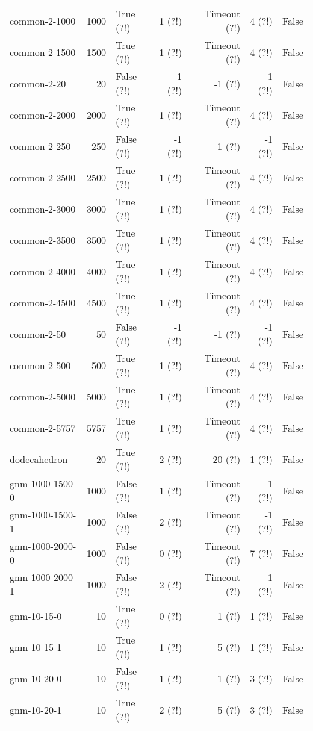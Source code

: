 \begin{longtable}{lrlrrrl}
common-2-1000 & 1000 & True (?!) & 1 (?!) & Timeout (?!) & 4 (?!) & False \\
common-2-1500 & 1500 & True (?!) & 1 (?!) & Timeout (?!) & 4 (?!) & False \\
common-2-20 & 20 & False (?!) & -1 (?!) & -1 (?!) & -1 (?!) & False \\
common-2-2000 & 2000 & True (?!) & 1 (?!) & Timeout (?!) & 4 (?!) & False \\
common-2-250 & 250 & False (?!) & -1 (?!) & -1 (?!) & -1 (?!) & False \\
common-2-2500 & 2500 & True (?!) & 1 (?!) & Timeout (?!) & 4 (?!) & False \\
common-2-3000 & 3000 & True (?!) & 1 (?!) & Timeout (?!) & 4 (?!) & False \\
common-2-3500 & 3500 & True (?!) & 1 (?!) & Timeout (?!) & 4 (?!) & False \\
common-2-4000 & 4000 & True (?!) & 1 (?!) & Timeout (?!) & 4 (?!) & False \\
common-2-4500 & 4500 & True (?!) & 1 (?!) & Timeout (?!) & 4 (?!) & False \\
common-2-50 & 50 & False (?!) & -1 (?!) & -1 (?!) & -1 (?!) & False \\
common-2-500 & 500 & True (?!) & 1 (?!) & Timeout (?!) & 4 (?!) & False \\
common-2-5000 & 5000 & True (?!) & 1 (?!) & Timeout (?!) & 4 (?!) & False \\
common-2-5757 & 5757 & True (?!) & 1 (?!) & Timeout (?!) & 4 (?!) & False \\
dodecahedron & 20 & True (?!) & 2 (?!) & 20 (?!) & 1 (?!) & False \\
gnm-1000-1500-0 & 1000 & False (?!) & 1 (?!) & Timeout (?!) & -1 (?!) & False \\
gnm-1000-1500-1 & 1000 & False (?!) & 2 (?!) & Timeout (?!) & -1 (?!) & False \\
gnm-1000-2000-0 & 1000 & False (?!) & 0 (?!) & Timeout (?!) & 7 (?!) & False \\
gnm-1000-2000-1 & 1000 & False (?!) & 2 (?!) & Timeout (?!) & -1 (?!) & False \\
gnm-10-15-0 & 10 & True (?!) & 0 (?!) & 1 (?!) & 1 (?!) & False \\
gnm-10-15-1 & 10 & True (?!) & 1 (?!) & 5 (?!) & 1 (?!) & False \\
gnm-10-20-0 & 10 & False (?!) & 1 (?!) & 1 (?!) & 3 (?!) & False \\
gnm-10-20-1 & 10 & True (?!) & 2 (?!) & 5 (?!) & 3 (?!) & False \\

\end{longtable}
